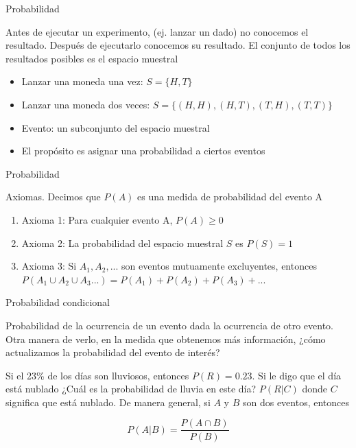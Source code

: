 \documentclass{beamer}
\begin{document}
\begin{frame}{Probabilidad}

Antes de ejecutar un experimento, (ej. lanzar un dado) no conocemos el resultado. Después de ejecutarlo conocemos su resultado. El conjunto de todos los resultados posibles es el espacio muestral

\begin{itemize}
    \item Lanzar una moneda una vez: $S=\{H,T\}$
    \item Lanzar una moneda dos veces: $S=\{(H,H),(H,T),(T,H),(T,T)\}$
    \item Evento: un subconjunto del espacio muestral
    \item El propósito es asignar una probabilidad a ciertos eventos
\end{itemize}
    
\end{frame}

\begin{frame}{Probabilidad}

Axiomas. Decimos que $P(A)$ es una medida de probabilidad del evento A

\begin{enumerate}
    \item Axioma 1: Para cualquier evento A, $P(A)\geq 0$
    \item Axioma 2: La probabilidad del espacio muestral $S$ es $P(S)=1$
    \item Axioma 3: Si $A_1,A_2,...$ son eventos mutuamente excluyentes, entonces $P(A_1\cup A_2 \cup A_3...)=P(A_1)+P(A_2)+P(A_3)+... $
\end{enumerate}
    
\end{frame}

\begin{frame}{Probabilidad condicional}

Probabilidad de la ocurrencia de un evento dada la ocurrencia de otro evento. Otra manera de verlo, en la medida que obtenemos más información, ¿cómo actualizamos la probabilidad del evento de interés?

Si el 23\% de los días son lluviosos, entonces $P(R)=0.23$. Si le digo que el día está nublado ¿Cuál es la probabilidad de lluvia en este día? $P(R|C)$ donde $C$ significa que está nublado. De manera general, si $A$ y $B$ son dos eventos, entonces

\begin{equation*}
    P(A|B)=\dfrac{P(A\cap B)}{P(B)}
\end{equation*}
\end{frame}
\end{document}

